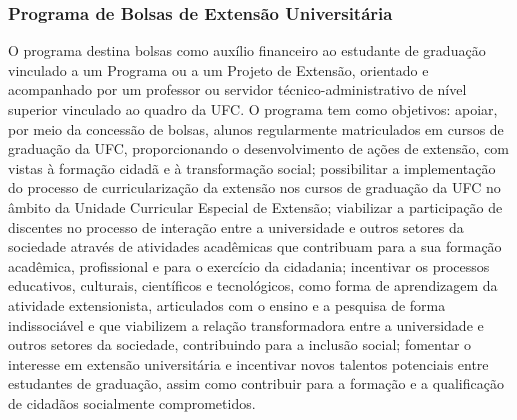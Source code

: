 \subsubsection{Programa de Bolsas de Extensão Universitária}


O programa destina bolsas como auxílio financeiro ao estudante de graduação vinculado a um Programa ou a um Projeto de Extensão, orientado e acompanhado por um professor ou servidor técnico-administrativo de nível superior vinculado ao quadro da UFC. O programa tem como objetivos: apoiar, por meio da concessão de bolsas, alunos regularmente matriculados em cursos de graduação da UFC, proporcionando o desenvolvimento de ações de extensão, com vistas à formação cidadã e à transformação social; 
possibilitar a implementação do processo de curricularização da
extensão nos cursos de graduação da UFC no âmbito da Unidade Curricular
Especial de Extensão;
viabilizar a participação de discentes no processo de interação entre a universidade e outros setores da sociedade através de atividades acadêmicas que contribuam para a sua formação acadêmica, profissional e para o exercício da cidadania; 
incentivar os processos educativos, culturais, científicos e tecnológicos, como forma de aprendizagem da atividade extensionista, articulados com o ensino e a pesquisa de forma indissociável e que viabilizem a relação transformadora entre a universidade e outros setores da sociedade, contribuindo para a inclusão social; 
fomentar o interesse em extensão universitária e incentivar novos talentos potenciais entre estudantes de graduação, assim como contribuir para a formação e a qualificação de cidadãos socialmente comprometidos.

